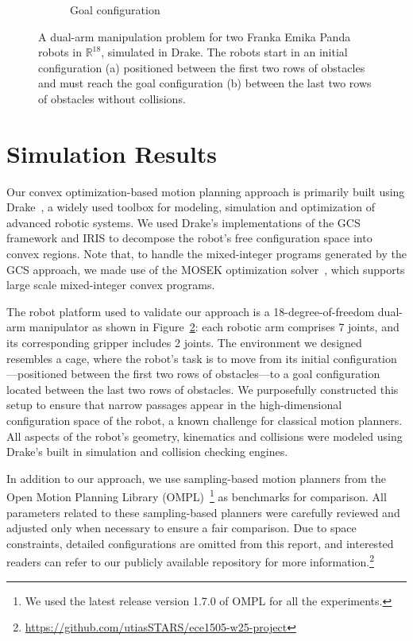 \begin{figure}[!t]
\begin{subfigure}[b]{0.19\textwidth}
        \captionsetup{justification=centering}
        \caption{Goal configuration}
        \label{subfig:cage_goal_orbit}
    \end{subfigure}
    \caption{A dual-arm manipulation problem for two Franka Emika Panda robots in $\mathbb{R}^{18}$, simulated in Drake. The robots start in an initial configuration (a) positioned between the first two rows of obstacles and must reach the goal configuration (b) between the last two rows of obstacles without collisions.}
    \label{fig:simulation}
\end{figure}

\section{Simulation Results}\label{sec:results}

Our convex optimization-based motion planning approach is primarily built using Drake~\cite{drake}, a widely used toolbox for modeling, simulation and optimization of advanced robotic systems.
We used Drake's implementations of the GCS framework and IRIS to decompose the robot's free configuration space into convex regions.
Note that, to handle the mixed-integer programs generated by the GCS approach, we made use of the MOSEK optimization solver~\cite{mosek}, which supports large scale mixed-integer convex programs.

The robot platform used to validate our approach is a 18-degree-of-freedom dual-arm manipulator as shown in Figure~\ref{fig:simulation}: each robotic arm comprises 7 joints, and its corresponding gripper includes 2 joints.
The environment we designed resembles a cage, where the robot's task is to move from its initial configuration---positioned between the first two rows of obstacles---to a goal configuration located between the last two rows of obstacles.
We purposefully constructed this setup to ensure that narrow passages appear in the high-dimensional configuration space of the robot, a known challenge for classical motion planners.
All aspects of the robot's geometry, kinematics and collisions were modeled using Drake's built in simulation and collision checking engines.

In addition to our approach, we use sampling-based motion planners from the Open Motion Planning Library (OMPL)~\cite{sucan2012open}\footnote{We used the latest release version 1.7.0 of OMPL for all the experiments.} as benchmarks for comparison. All parameters related to these sampling-based planners were carefully reviewed and adjusted only when necessary to ensure a fair comparison. Due to space constraints, detailed configurations are omitted from this report, and interested readers can refer to our publicly available repository for more information.\footnote{\url{https://github.com/utiasSTARS/ece1505-w25-project}}


